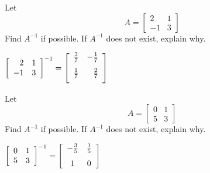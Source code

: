 \documentclass{ximera}
\begin{document}
\begin{problem}\label{prb:4.35} Let
\begin{equation*}
A=\left[
\begin{array}{rr}
2 & 1 \\
-1 & 3
\end{array}
\right]
\end{equation*}
Find $A^{-1}$ if possible. If $A^{-1}$ does not exist, explain why.
\begin{hint}
$\left[
\begin{array}{rr}
2 & 1 \\
-1 & 3
\end{array}
\right]^{-1}= \left[
\begin{array}{rr}
\vspace{0.05in}\frac{3}{7} & -\vspace{0.05in}\frac{1}{7} \\
\vspace{0.05in}\frac{1}{7} & \vspace{0.05in}\frac{2}{7}
\end{array}
\right]$
\end{hint}
\end{problem}

\begin{problem}\label{prb:4.36}Let
\begin{equation*}
A=\left[
\begin{array}{rr}
0 & 1 \\
5 & 3
\end{array}
\right]
\end{equation*}
Find $A^{-1}$ if possible. If $A^{-1}$ does not exist, explain why.
\begin{hint}
$\left[
\begin{array}{cc}
0 & 1 \\
5 & 3
\end{array}
\right]^{-1}= \left[
\begin{array}{cc}
-\vspace{0.05in}\frac{3}{5} & \vspace{0.05in}\frac{1}{5} \\
1 & 0
\end{array}
\right]$
\end{hint}
\end{problem}
\end{document}
